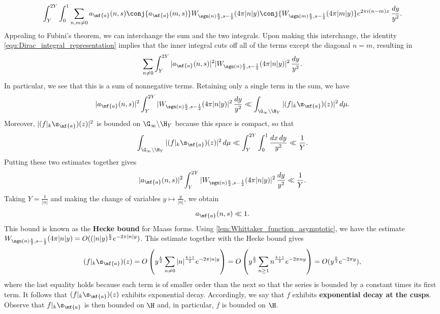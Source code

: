     \[
      \int_{Y}^{2Y}\int_{0}^{1}\sum_{n,m \neq 0}a_{\mf{a}}(n,s)\conj{a_{\mf{a}}(m,s)}W_{\sgn(n)\frac{k}{2},s-\frac{1}{2}}(4\pi|n|y)\conj{W_{\sgn(m)\frac{k}{2},s-\frac{1}{2}}(4\pi|m|y)}e^{2\pi i(n-m)x}\,\frac{dy}{y^{2}}.
    \]
    Appealing to Fubini's theorem, we can interchange the sum and the two integrals. Upon making this interchange, the identity \cref{equ:Dirac_integral_representation} implies that the inner integral cuts off all of the terms except the diagonal $n = m$, resulting in
    \[
      \sum_{n \neq 0}\int_{Y}^{2Y}|a_{\mf{a}}(n,s)|^{2}|W_{\sgn(n)\frac{k}{2},s-\frac{1}{2}}(4\pi|n|y)|^{2}\,\frac{dy}{y^{2}}.
    \]
    In particular, we see that this is a sum of nonnegative terms. Retaining only a single term in the sum, we have
    \[
      |a_{\mf{a}}(n,s)|^{2}\int_{Y}^{2Y}|W_{\sgn(n)\frac{k}{2},s-\frac{1}{2}}(4\pi|n|y)|^{2}\,\frac{dy}{y^{2}} \ll \int_{\G_{\infty}\backslash\H_{Y}}|(f|_{k}\s_{\mf{a}})(z)|^{2}\,d\mu.
    \]
    Moreover, $|(f|_{k}\s_{\mf{a}})(z)|^{2}$ is bounded on $\G_{\infty}\backslash\H_{Y}$ because this space is compact, so that
    \[
      \int_{\G_{\infty}\backslash\H_{Y}}|(f|_{k}\s_{\mf{a}})(z)|^{2}\,d\mu \ll \int_{Y}^{2Y}\int_{0}^{1}\frac{dx\,dy}{y^{2}} \ll \frac{1}{Y}.
    \]
    Putting these two estimates together gives
    \[
      |a_{\mf{a}}(n,s)|^{2}\int_{Y}^{2Y}|W_{\sgn(n)\frac{k}{2},s-\frac{1}{2}}(4\pi|n|y)|^{2}\,\frac{dy}{y^{2}} \ll \frac{1}{Y}.
    \]
    Taking $Y = \frac{1}{|n|}$ and making the change of variables $y \mapsto \frac{y}{|n|}$, we obtain
    \[
      a_{\mf{a}}(n,s) \ll 1.
    \]
    This bound is known as the \textbf{Hecke bound} for Maass forms. Using \cref{lem:Whittaker_function_asymptotic}, we have the estimate $W_{\sgn(n)\frac{k}{2},s-\frac{1}{2}}(4\pi|n|y) = O((|n|y)^{\frac{k}{2}}e^{-2\pi|n|y})$. This estimate together with the Hecke bound gives
    \[
      (f|_{k}\s_{\mf{a}})(z) = O\left(y^{\frac{k}{2}}\sum_{n \neq 0}|n|^{\frac{k+1}{2}}e^{-2\pi|n|y}\right) = O\left(y^{\frac{k}{2}}\sum_{n \ge 1}n^{\frac{k+1}{2}}e^{-2\pi ny}\right) = O(y^{\frac{k}{2}}e^{-2\pi y}),
    \]
    where the last equality holds because each term is of smaller order than the next so that the series is bounded by a constant times its first term. It follows that $(f|_{k}\s_{\mf{a}})(z)$ exhibits exponential decay. Accordingly, we say that $f$ exhibits \textbf{exponential decay at the cusps}. Observe that $f|_{k}\s_{\mf{a}}$ is then bounded on $\H$ and, in particular, $f$ is bounded on $\H$.
